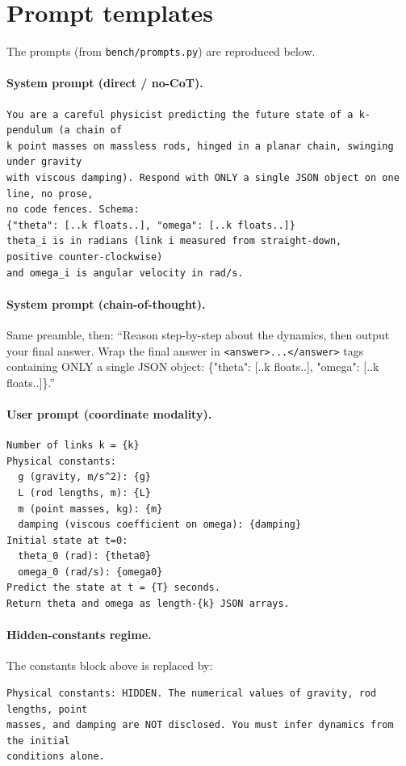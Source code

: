\documentclass{article}
\begin{document}
\appendix
\section{Prompt templates}
The prompts (from \texttt{bench/prompts.py}) are reproduced below.

\paragraph{System prompt (direct / no-CoT).}
\begin{small}\begin{verbatim}
You are a careful physicist predicting the future state of a k-pendulum (a chain of
k point masses on massless rods, hinged in a planar chain, swinging under gravity
with viscous damping). Respond with ONLY a single JSON object on one line, no prose,
no code fences. Schema:
{"theta": [..k floats..], "omega": [..k floats..]}
theta_i is in radians (link i measured from straight-down,
positive counter-clockwise)
and omega_i is angular velocity in rad/s.
\end{verbatim}\end{small}

\paragraph{System prompt (chain-of-thought).} Same preamble, then: ``Reason step-by-step
about the dynamics, then output your final answer. Wrap the final answer in
\texttt{<answer>...</answer>} tags containing ONLY a single JSON object:
\{"theta": [..k floats..], "omega": [..k floats..]\}.''

\paragraph{User prompt (coordinate modality).}
\begin{small}\begin{verbatim}
Number of links k = {k}
Physical constants:
  g (gravity, m/s^2): {g}
  L (rod lengths, m): {L}
  m (point masses, kg): {m}
  damping (viscous coefficient on omega): {damping}
Initial state at t=0:
  theta_0 (rad): {theta0}
  omega_0 (rad/s): {omega0}
Predict the state at t = {T} seconds.
Return theta and omega as length-{k} JSON arrays.
\end{verbatim}\end{small}

\paragraph{Hidden-constants regime.} The constants block above is replaced by:
\begin{small}\begin{verbatim}
Physical constants: HIDDEN. The numerical values of gravity, rod lengths, point
masses, and damping are NOT disclosed. You must infer dynamics from the initial
conditions alone.
\end{verbatim}\end{small}
\end{document}
